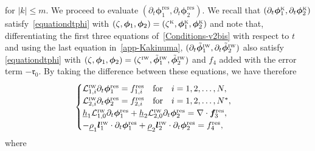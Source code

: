 \documentclass[11pt,leqno]{article}
\numberwithin{equation}{section}
\numberwithin{figure}{section}
\begin{document}
%
for $|k|\leq m$. 
We proceed to evaluate $(\partial_t\bm{\phi}_1^\mathrm{res},\partial_t\bm{\phi}_2^\mathrm{res})$. 
We recall that $(\partial_t\bm{\phi}_1^{\mbox{\rm\tiny K}},\partial_t\bm{\phi}_2^{\mbox{\rm\tiny K}})$ satisfy~\eqref{equationdtphi} with 
$(\zeta,\bm{\phi}_1,\bm{\phi}_2)=(\zeta^{\mbox{\rm\tiny K}},\bm{\phi}_1^{\mbox{\rm\tiny K}},\bm{\phi}_2^{\mbox{\rm\tiny K}})$ 
and note that, differentiating the first three equations of~\eqref{Conditions-v2bis} with respect to $t$ 
and using the last equation in~\eqref{app-Kakinuma}, 
$(\partial_t\tilde{\bm{\phi}}_1^{\mbox{\rm\tiny IW}},\partial_t\tilde{\bm{\phi}}_2^{\mbox{\rm\tiny IW}})$ also satisfy 
\eqref{equationdtphi} with $(\zeta,\bm{\phi}_1,\bm{\phi}_2)
=(\zeta^{\mbox{\rm\tiny IW}},\tilde{\bm{\phi}}_1^{\mbox{\rm\tiny IW}},\tilde{\bm{\phi}}_2^{\mbox{\rm\tiny IW}})$ 
and $f_4$ added with the error term $-\mathfrak{r}_0$. 
By taking the difference between these equations, we have therefore 
%
\[
\begin{cases}
 \mathcal{L}_{1,i}^{\mbox{\rm\tiny IW}} \partial_t\bm{\phi}_1^\mathrm{res} = f_{1,i}^\mathrm{res} \quad\mbox{for}\quad i=1,2,\ldots,N, \\
 \mathcal{L}_{2,i}^{\mbox{\rm\tiny IW}} \partial_t\bm{\phi}_2^\mathrm{res} = f_{2,i}^\mathrm{res} \quad\mbox{for}\quad i=1,2,\ldots,N^*, \\
 \underline{h}_1\mathcal{L}_{1,0}^{\mbox{\rm\tiny IW}} \partial_t\bm{\phi}_1^\mathrm{res}
  + \underline{h}_2\mathcal{L}_{2,0}^{\mbox{\rm\tiny IW}} \partial_t\bm{\phi}_2^\mathrm{res} = \nabla\cdot\bm{f}_3^\mathrm{res}, \\
 - \underline{\rho}_1\bm{l}_1^{\mbox{\rm\tiny IW}} \cdot \partial_t\bm{\phi}_1^\mathrm{res}
  + \underline{\rho}_2\bm{l}_2^{\mbox{\rm\tiny IW}} \cdot \partial_t\bm{\phi}_2^\mathrm{res} = f_4^\mathrm{res},
\end{cases}
\]
%
where 
%
\end{document}
